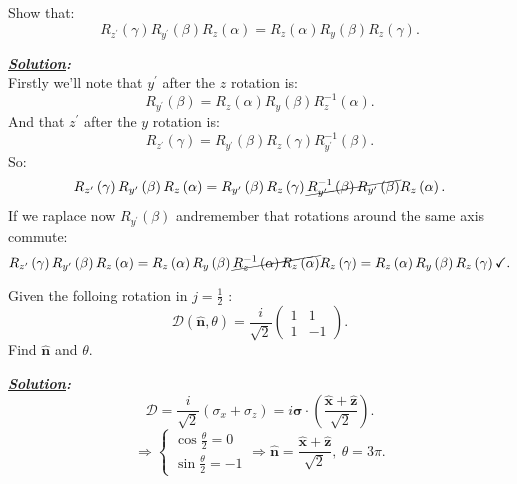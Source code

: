 \documentclass[notitlepage]{report}
\begin{document}
\begin{question}[title = Question 2]{}{}
Show that:\\
\[
	R_{z^\prime}\left(\gamma\right)R_{y^\prime}\left(\beta\right)R_{z}\left(\alpha\right)=	R_{z}\left(\alpha\right)R_{y}\left(\beta\right)R_{z}\left(\gamma\right)   
.\] 
\end{question}
\textbf{\emph{\underline{Solution}:}}\\
Firstly we'll note that $y^\prime$ after the $z$ rotation is:\\
\[
	R_{y^\prime}\left(\beta\right)=R_{z}\left(\alpha\right)R_y\left(\beta\right)R_z^{-1}\left(\alpha\right)    
.\] 
And that $z^\prime$ after the $y$ rotation is:\\
\[
	R_{z^\prime}\left(\gamma\right)=R_{y^\prime}\left(\beta\right)R_z\left(\gamma\right)R_{y^\prime}^{-1}\left(\beta\right)    
.\] 
So:\\
\[
		R_{z^\prime}\left(\gamma\right)R_{y^\prime}\left(\beta\right)R_{z}\left(\alpha\right)=R_{y^\prime}\left(\beta\right)R_z\left(\gamma\right)\cancel{R_{y^\prime}^{-1}\left(\beta\right)    R_{y^\prime}\left(\beta\right)}R_{z}\left(\alpha\right)
.\] 
If we raplace now $R_{y^\prime}\left(\beta\right) $ andremember that rotations around the same axis commute:\\
\[
		R_{z^\prime}\left(\gamma\right)R_{y^\prime}\left(\beta\right)R_{z}\left(\alpha\right)=R_{z}\left(\alpha\right)R_y\left(\beta\right)\cancel{R_z^{-1}\left(\alpha\right)    
R_{z}\left(\alpha\right)}R_z\left(\gamma\right)=R_{z}\left(\alpha\right)R_{y}\left(\beta\right)R_{z}\left(\gamma\right)\checkmark.
\] 
\begin{question}[title = Question 3]{}{}
Given the folloing rotation in $j=\frac{1}{2}$ :\\
\[
	\mathcal{D}\left(\hat{\boldsymbol{n}},\theta\right)=\frac{i}{\sqrt{2} }
	\begin{pmatrix}
		1 & 1\\
		1 & -1
	\end{pmatrix}
.\] 
Find $\hat{\boldsymbol{n}}$ and $\theta$.
\end{question}
\textbf{\emph{\underline{Solution}:}}\\
\[
	\mathcal{D}=\frac{i}{\sqrt{2} } \left(\sigma_{x}+\sigma_z\right)=i\boldsymbol{\sigma}\cdot\left(\frac{\hat{\boldsymbol{x}}+\hat{\boldsymbol{z}}}{\sqrt{2} }\right)  
.\] 
\[
	\Rightarrow 
	\begin{cases}
		\cos \frac{\theta}{2}=0\\
		\sin \frac{\theta}{2}=-1
	\end{cases}
	\Rightarrow \boxed{\hat{\boldsymbol{n}}=\frac{\hat{\boldsymbol{x}}+\hat{\boldsymbol{z}}}{\sqrt{2} },\ \theta=3\pi}
.\] 
\end{document}
